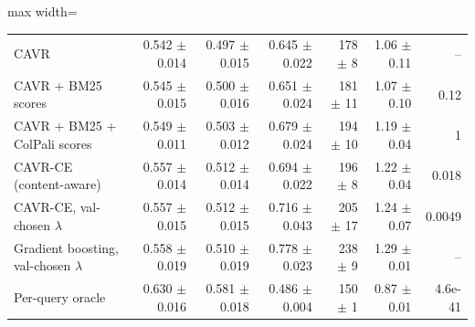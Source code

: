 \begin{table}[t]
\begin{adjustbox}{max width=\linewidth}
\begin{tabular}{lrrrrrr}
CAVR & 0.542 $\pm$ 0.014 & 0.497 $\pm$ 0.015 & 0.645 $\pm$ 0.022 & 178 $\pm$ 8 & 1.06 $\pm$ 0.11 & -- \\
CAVR + BM25 scores & 0.545 $\pm$ 0.015 & 0.500 $\pm$ 0.016 & 0.651 $\pm$ 0.024 & 181 $\pm$ 11 & 1.07 $\pm$ 0.10 & 0.12 \\
CAVR + BM25 + ColPali scores & 0.549 $\pm$ 0.011 & 0.503 $\pm$ 0.012 & 0.679 $\pm$ 0.024 & 194 $\pm$ 10 & 1.19 $\pm$ 0.04 & 1 \\
CAVR-CE (content-aware) & 0.557 $\pm$ 0.014 & 0.512 $\pm$ 0.014 & 0.694 $\pm$ 0.022 & 196 $\pm$ 8 & 1.22 $\pm$ 0.04 & 0.018 \\
CAVR-CE, val-chosen $\lambda$ & 0.557 $\pm$ 0.015 & 0.512 $\pm$ 0.015 & 0.716 $\pm$ 0.043 & 205 $\pm$ 17 & 1.24 $\pm$ 0.07 & 0.0049 \\
Gradient boosting, val-chosen $\lambda$ & 0.558 $\pm$ 0.019 & 0.510 $\pm$ 0.019 & 0.778 $\pm$ 0.023 & 238 $\pm$ 9 & 1.29 $\pm$ 0.01 & -- \\
Per-query oracle & 0.630 $\pm$ 0.016 & 0.581 $\pm$ 0.018 & 0.486 $\pm$ 0.004 & 150 $\pm$ 1 & 0.87 $\pm$ 0.01 & 4.6e-41 \\
\bottomrule
\end{tabular}
\end{adjustbox}
\end{table}
